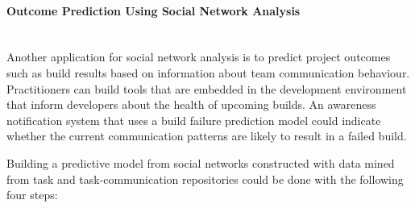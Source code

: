 \documentclass[12pt,oneside]{book}
\begin{document}

\paragraph{Outcome Prediction Using Social Network Analysis}
\ \\
Another application for social network analysis is to predict project outcomes
such as build results based on information about team communication behaviour.
Practitioners can build tools that are embedded in the development environment
that inform developers about the health of upcoming builds. An awareness
notification system that uses a build failure prediction model could indicate
whether the current communication patterns are likely to result in a failed build. 

Building a predictive model from social networks constructed with data mined
from task and task-communication repositories could be done with the following
four steps:





\end{document}
